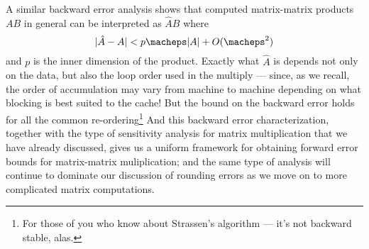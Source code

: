 A similar backward error analysis shows that computed matrix-matrix
products $AB$ in general can be interpreted as $\hat{A} B$ where
\[
  |\hat{A}-A| < p \macheps |A| + O(\macheps^2)
\]
and $p$ is the inner dimension of the product.  Exactly what $\hat{A}$
is depends not only on the data, but also the loop order used in the
multiply --- since, as we recall, the order of accumulation may vary
from machine to machine depending on what blocking is best suited to
the cache!  But the bound on the backward error holds for all the common
re-ordering\footnote{%
For those of you who know about Strassen's algorithm --- it's not
backward stable, alas.
}
And this backward error characterization, together with the
type of sensitivity analysis for matrix multiplication that we have
already discussed, gives us a uniform framework for obtaining
forward error bounds for matrix-matrix muliplication; and the same
type of analysis will continue to dominate our discussion of rounding
errors as we move on to more complicated matrix computations.
